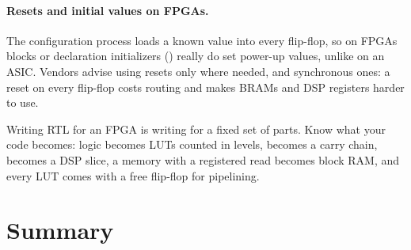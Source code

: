 \paragraph{Resets and initial values on FPGAs.} The configuration process loads a known value into every flip-flop, so on FPGAs  blocks or declaration initializers () really do set power-up values, unlike on an ASIC. Vendors advise using resets only where needed, and synchronous ones: a reset on every flip-flop costs routing and makes BRAMs and DSP registers harder to use.

\begin{bigidea}
Writing RTL for an FPGA is writing for a fixed set of parts. Know what your code becomes: logic becomes LUTs counted in levels, \code{+} becomes a carry chain, \code{*} becomes a DSP slice, a memory with a registered read becomes block RAM, and every LUT comes with a free flip-flop for pipelining.
\end{bigidea}

\section{Summary}

